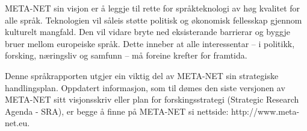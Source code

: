 \begin{multicols}{2}
META-NET sin visjon er å leggje til rette for språkteknologi av høg kvalitet for alle språk. Teknologien vil såleis støtte politisk og økonomisk fellesskap gjennom kulturelt mangfald. Den vil vidare bryte ned eksisterande barrierar og byggje bruer mellom europeiske språk. Dette inneber at alle interessentar -- i politikk, forsking, næringsliv og samfunn -- må foreine krefter for framtida. 

Denne språkrapporten utgjer ein viktig del av META-NET sin strategiske handlingsplan. Oppdatert informasjon, som til dømes den siste versjonen av META-NET sitt visjonsskriv \cite{Meta1} eller plan for forskingsstrategi (Strategic Research Agenda - SRA), er begge å finne på META-NET si nettside: http://www.meta-net.eu.
\end{multicols}

\clearpage


